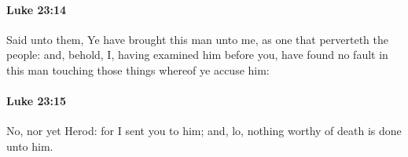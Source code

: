 		\paragraph{Luke 23:14} %
			\label{LUKE-23-14}

			Said unto them, Ye have brought this man unto me, as one that perverteth the people: and, behold, I, having examined him before you, have found no fault in this man touching those things whereof ye accuse him:

			\begin{framed}
			\scriptsize
				\begin{compactdesc}
					\item[SBLG] 
				\end{compactdesc}
			\end{framed}

		\paragraph{Luke 23:15} %
			\label{LUKE-23-15}

			No, nor yet Herod: for I sent you to him; and, lo, nothing worthy of death is done unto him.


